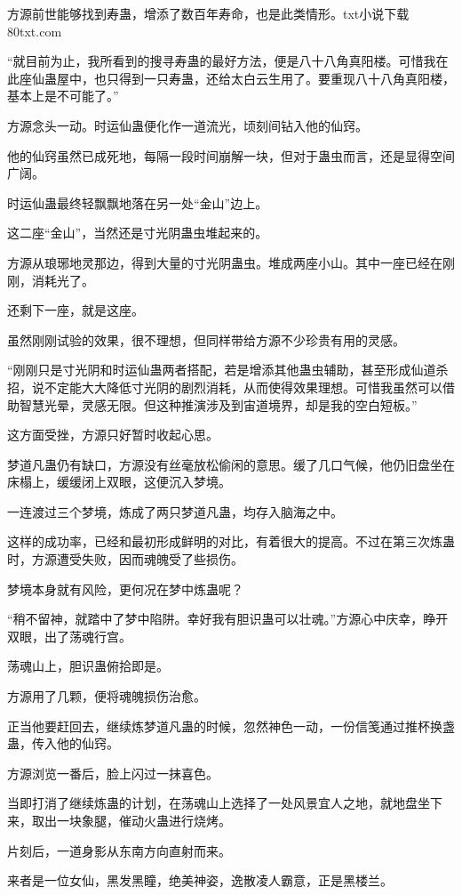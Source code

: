 \begin{this_body}
方源前世能够找到寿蛊，增添了数百年寿命，也是此类情形。txt小说下载80txt.com

“就目前为止，我所看到的搜寻寿蛊的最好方法，便是八十八角真阳楼。可惜我在此座仙蛊屋中，也只得到一只寿蛊，还给太白云生用了。要重现八十八角真阳楼，基本上是不可能了。”

方源念头一动。时运仙蛊便化作一道流光，顷刻间钻入他的仙窍。

他的仙窍虽然已成死地，每隔一段时间崩解一块，但对于蛊虫而言，还是显得空间广阔。

时运仙蛊最终轻飘飘地落在另一处“金山”边上。

这二座“金山”，当然还是寸光阴蛊虫堆起来的。

方源从琅琊地灵那边，得到大量的寸光阴蛊虫。堆成两座小山。其中一座已经在刚刚，消耗光了。

还剩下一座，就是这座。

虽然刚刚试验的效果，很不理想，但同样带给方源不少珍贵有用的灵感。

“刚刚只是寸光阴和时运仙蛊两者搭配，若是增添其他蛊虫辅助，甚至形成仙道杀招，说不定能大大降低寸光阴的剧烈消耗，从而使得效果理想。可惜我虽然可以借助智慧光晕，灵感无限。但这种推演涉及到宙道境界，却是我的空白短板。”

这方面受挫，方源只好暂时收起心思。

梦道凡蛊仍有缺口，方源没有丝毫放松偷闲的意思。缓了几口气候，他仍旧盘坐在床榻上，缓缓闭上双眼，这便沉入梦境。

一连渡过三个梦境，炼成了两只梦道凡蛊，均存入脑海之中。

这样的成功率，已经和最初形成鲜明的对比，有着很大的提高。不过在第三次炼蛊时，方源遭受失败，因而魂魄受了些损伤。

梦境本身就有风险，更何况在梦中炼蛊呢？

“稍不留神，就踏中了梦中陷阱。幸好我有胆识蛊可以壮魂。”方源心中庆幸，睁开双眼，出了荡魂行宫。

荡魂山上，胆识蛊俯拾即是。

方源用了几颗，便将魂魄损伤治愈。

正当他要赶回去，继续炼梦道凡蛊的时候，忽然神色一动，一份信笺通过推杯换盏蛊，传入他的仙窍。

方源浏览一番后，脸上闪过一抹喜色。

当即打消了继续炼蛊的计划，在荡魂山上选择了一处风景宜人之地，就地盘坐下来，取出一块象腿，催动火蛊进行烧烤。

片刻后，一道身影从东南方向直射而来。

来者是一位女仙，黑发黑瞳，绝美神姿，逸散凌人霸意，正是黑楼兰。


\end{this_body}
